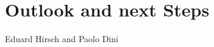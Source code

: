 \chapter{Outlook and next Steps}
\label{ch:outlook}

\vspace{-1cm}
\begin{center}
Eduard Hirsch and Paolo Dini
\end{center}

